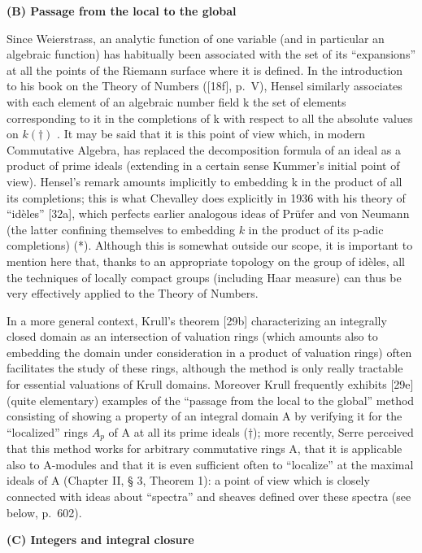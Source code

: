 \textbf{(B) Passage from the local to the global}\par

Since Weierstrass, an analytic function of one variable (and in particular an algebraic function) has habitually been associated with the set of its ``expansions'' at all the points of the Riemann surface where it is defined. In the introduction to his book on the Theory of Numbers ({[}18f{]}, p.~V), Hensel similarly associates with each element of an algebraic number field k the set of elements corresponding to it in the completions of k with respect to all the absolute values on \(k (\dagger)\) . It may be said that it is this point of view which, in modern Commutative Algebra, has replaced the decomposition formula of an ideal as a product of prime ideals (extending in a certain sense Kummer's initial point of view). Hensel's remark amounts implicitly to embedding k in the product of all its completions; this is what Chevalley does explicitly in 1936 with his theory of ``idèles'' {[}32a{]}, which perfects earlier analogous ideas of Prüfer and von Neumann (the latter confining themselves to embedding \(k\) in the product of its p-adic completions) (*). Although this is somewhat outside our scope, it is important to mention here that, thanks to an appropriate topology on the group of idèles, all the techniques of locally compact groups (including Haar measure) can thus be very effectively applied to the Theory of Numbers.

In a more general context, Krull's theorem {[}29b{]} characterizing an integrally closed domain as an intersection of valuation rings (which amounts also to embedding the domain under consideration in a product of valuation rings) often facilitates the study of these rings, although the method is only really tractable for essential valuations of Krull domains. Moreover Krull frequently exhibits {[}29e{]} (quite elementary) examples of the ``passage from the local to the global'' method consisting of showing a property of an integral domain A by verifying it for the ``localized'' rings \(A_{p}\) of A at all its prime ideals (†); more recently, Serre perceived that this method works for arbitrary commutative rings A, that it is applicable also to A-modules and that it is even sufficient often to ``localize'' at the maximal ideals of A (Chapter II, § 3, Theorem 1): a point of view which is closely connected with ideas about ``spectra'' and sheaves defined over these spectra (see below, p.~602).

\textbf{(C) Integers and integral closure}\par

